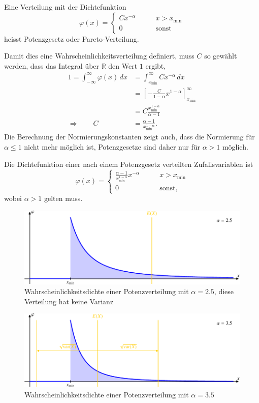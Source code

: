 \begin{definition}
Eine Verteilung mit der Dichtefunktion
\[
\varphi(x)=\begin{cases}
Cx^{-\alpha}&\qquad x>x_{\min}\\
0&\qquad\text{sonst}
\end{cases}
\]
heisst Potenzgesetz oder Pareto-Verteilung.
\end{definition}
Damit dies eine Wahrscheinlichkeitsverteilung definiert, muss $C$
so gewählt werden, dass das Integral über $\mathbb R$ den Wert $1$
ergibt,
\begin{align*}
1=\int_{-\infty}^\infty\varphi(x)\,dx
&=
\int_{x_{\min}}^\infty Cx^{-\alpha}\,dx
\\
&=
\left[-\frac{C}{1-\alpha}x^{1-\alpha}\right]_{x_{\min}}^\infty
\\
&=
C\frac{x_{\min}^{1-\alpha}}{\alpha-1}
\\
\Rightarrow\qquad
C
&=
\frac{\alpha-1}{x_{\min}^{1-\alpha}}.
\end{align*}
Die Berechnung der Normierungskonstanten zeigt auch, dass die Normierung
für $\alpha \le 1$ nicht mehr möglich ist, Potenzgesetze sind daher
nur für $\alpha > 1$ möglich.

\begin{satz}
Die Dichtefunktion einer nach einem Potenzgesetz verteilten Zufallsvariablen
ist 
\[
\varphi(x)=\begin{cases}
\displaystyle
\frac{\alpha-1}{x_{\min}^{1-\alpha}}
x^{-\alpha}&\qquad x>x_{\min}
\\
0&\qquad\text{sonst},
\end{cases}
\]
wobei $\alpha>1$ gelten muss.
\end{satz}
\begin{figure}
\centering
\includegraphics{images/power-2.pdf}
\caption{Wahrscheinlichkeitsdichte einer Potenzverteilung mit $\alpha=2.5$,
diese Verteilung hat keine Varianz
\label{pareto-verteilung-2.5}}
\end{figure}
\begin{figure}
\centering
\includegraphics{images/power-3.pdf}
\caption{Wahrscheinlichkeitsdichte einer Potenzverteilung mit $\alpha=3.5$
\label{pareto-verteilung-3.5}}
\end{figure}

